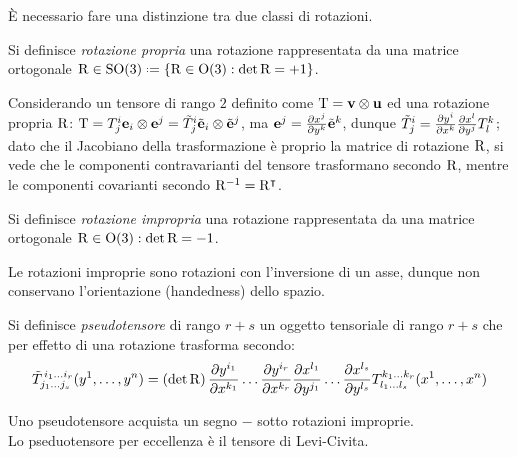 È necessario fare una distinzione tra due classi di rotazioni.

\begin{definition}
	Si definisce \textit{rotazione propria} una rotazione rappresentata da una matrice ortogonale $ \tens{R} \in \SOt \defeq \{\tens{R} \in \Ot : \det\tens{R} = +1 \} $.
\end{definition}

\begin{example}
	Considerando un tensore di rango $ 2 $ definito come $ \mathrm{T} = \mathbf{v} \otimes \mathbf{u} $ ed una rotazione propria $ \mathrm{R} $: $ \mathrm{T} = T^i_j \mathbf{e}_i \otimes \mathbf{e}^j = \tilde{T}^i_j \tilde{\mathbf{e}}_i \otimes \tilde{\mathbf{e}}^j $, ma $ \mathbf{e}^j = \frac{\partial x^j}{\partial y^k} \tilde{\mathbf{e}}^k $, dunque $ \tilde{T}^i_j = \frac{\partial y^i}{\partial x^k} \frac{\partial x^l}{\partial y^j} T^k_l $; dato che il Jacobiano della trasformazione è proprio la matrice di rotazione $ \mathrm{R} $, si vede che le componenti contravarianti del tensore trasformano secondo $ \mathrm{R} $, mentre le componenti covarianti secondo $ \mathrm{R}^{-1} = \mathrm{R}^{\intercal} $.
\end{example}

\begin{definition}
	Si definisce \textit{rotazione impropria} una rotazione rappresentata da una matrice ortogonale $ \mathrm{R} \in \mathrm{O}(3) : \det\mathrm{R} = -1 $.
\end{definition}

Le rotazioni improprie sono rotazioni con l'inversione di un asse, dunque non conservano l'orientazione (handedness) dello spazio.

\begin{definition}
	Si definisce \textit{pseudotensore} di rango $ r+s $ un oggetto tensoriale di rango $ r+s $ che per effetto di una rotazione trasforma secondo:
	\begin{equation}
		\tilde{T}^{\,i_1 \dots i_r}_{j_1 \dots j_s} (y^1, \dots, y^n) = \left(\det\mathrm{R}\right) \frac{\partial y^{i_1}}{\partial x^{k_1}} \dots \frac{\partial y^{i_r}}{\partial x^{k_r}} \frac{\partial x^{l_1}}{\partial y^{j_1}} \dots \frac{\partial x^{l_s}}{\partial y^{l_s}} T^{k_1 \dots k_r}_{l_1 \dots l_s} (x^1, \dots, x^n)
		\label{eq:9}
	\end{equation}
\end{definition}

Uno pseudotensore acquista un segno $ - $ sotto rotazioni improprie. \\
Lo pseduotensore per eccellenza è il tensore di Levi-Civita.

